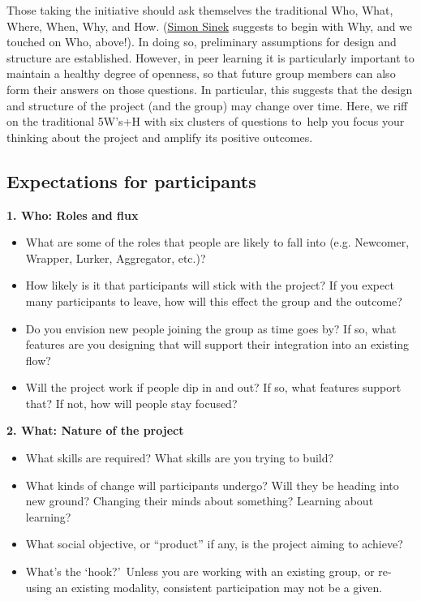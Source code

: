 Those taking the initiative should ask themselves the traditional Who,
What, Where, When, Why, and How.
(\href{http://en.wikipedia.org/wiki/Simon_Sinek}{Simon Sinek} suggests
to begin with Why, and we touched on Who, above!). In doing so,
preliminary assumptions for design and structure are established.
However, in peer learning it is particularly important to maintain a
healthy degree of openness, so that future group members can also form
their answers on those questions. In particular, this suggests that the
design and structure of the project (and the group) may change over
time. Here, we riff on the traditional 5W's+H with six clusters of
questions to~help you focus your thinking about the project and amplify
its positive outcomes.

\subsection{Expectations for participants}

\textbf{1. Who: Roles and flux}

\begin{itemize}
\itemsep1pt\parskip0pt
\item
  What are some of the roles that people are likely to fall into (e.g.
  Newcomer, Wrapper, Lurker, Aggregator, etc.)?
\item
  How likely is it that participants will stick with the project? If you
  expect many participants to leave, how will this effect the group and
  the outcome?
\item
  Do you envision new people joining the group as time goes by? If so,
  what features are you designing that will support their integration
  into an existing flow?
\item
  Will the project work if people dip in and out? If so, what features
  support that? If not, how will people stay focused?
\end{itemize}

\clearpage

\textbf{2. What: Nature of the project}

\begin{itemize}
\itemsep1pt\parskip0pt
\item
  What skills are required? What skills are you trying to build?
\item
  What kinds of change will participants undergo? Will they be heading
  into new ground? Changing their minds about something? Learning about
  learning?
\item
  What social objective, or ``product'' if any, is the project aiming to
  achieve?
\item
  What's the `hook?'~Unless you are working with an existing group, or
  re-using an existing modality, consistent participation may not be a
  given.
\end{itemize}

